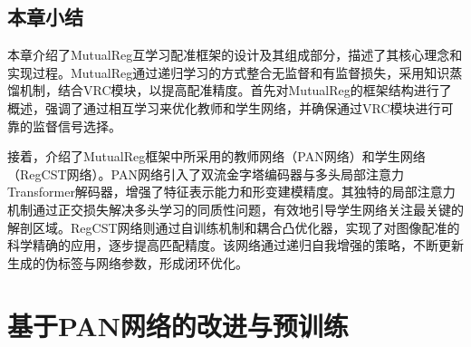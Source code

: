 \section{本章小结}

本章介绍了MutualReg互学习配准框架的设计及其组成部分，描述了其核心理念和实现过程。MutualReg通过递归学习的方式整合无监督和有监督损失，采用知识蒸馏机制，结合VRC模块，以提高配准精度。首先对MutualReg的框架结构进行了概述，强调了通过相互学习来优化教师和学生网络，并确保通过VRC模块进行可靠的监督信号选择。

接着，介绍了MutualReg框架中所采用的教师网络（PAN网络）和学生网络（RegCST网络）。PAN网络引入了双流金字塔编码器与多头局部注意力Transformer解码器，增强了特征表示能力和形变建模精度。其独特的局部注意力机制通过正交损失解决多头学习的同质性问题，有效地引导学生网络关注最关键的解剖区域。RegCST网络则通过自训练机制和耦合凸优化器，实现了对图像配准的科学精确的应用，逐步提高匹配精度。该网络通过递归自我增强的策略，不断更新生成的伪标签与网络参数，形成闭环优化。

\chapter{基于PAN网络的改进与预训练}







